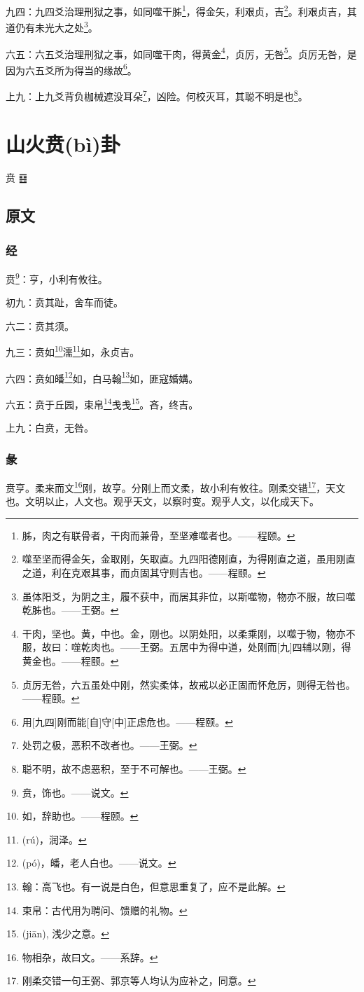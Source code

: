 \documentclass[12pt,oneside]{book}
\begin{document}
九四：九四爻治理刑狱之事，如同噬干胏\footnote{胏，肉之有联骨者，干肉而兼骨，至坚难噬者也。——程颐。}，得金矢，利艰贞，吉\footnote{噬至坚而得金矢，金取刚，矢取直。九四阳德刚直，为得刚直之道，虽用刚直之道，利在克艰其事，而贞固其守则吉也。——程颐。}。利艰贞吉，其道仍有未光大之处\footnote{虽体阳爻，为阴之主，履不获中，而居其非位，以斯噬物，物亦不服，故曰噬乾胏也。——王弼。}。

六五：六五爻治理刑狱之事，如同噬干肉，得黄金\footnote{干肉，坚也。黄，中也。金，刚也。以阴处阳，以柔乘刚，以噬于物，物亦不服，故曰：噬乾肉也。——王弼。五居中为得中道，处刚而[九]四辅以刚，得黄金也。——程颐。}，贞厉，无咎\footnote{贞厉无咎，六五虽处中刚，然实柔体，故戒以必正固而怀危厉，则得无咎也。——程颐。}。贞厉无咎，是因为六五爻所为得当的缘故\footnote{用[九四]刚而能[自]守[中]正虑危也。——程颐。}。

上九：上九爻背负枷械遮没耳朵\footnote{处罚之极，恶积不改者也。——王弼。}，凶险。何校灭耳，其聪不明是也\footnote{聪不明，故不虑恶积，至于不可解也。——王弼。}。



\chapter{山火贲(bì)卦}
贲 {\Large ䷕}

\section{原文}
\subsection{经}
贲\footnote{贲，饰也。——说文。}：亨，小利有攸往。

初九：贲其趾，舍车而徒。

六二：贲其须。

九三：贲如\footnote{如，辞助也。——程颐。}濡\footnote{(rú)，润泽。}如，永贞吉。

六四：贲如皤\footnote{(pó)，皤，老人白也。——说文。}如，白马翰\footnote{翰：高飞也。有一说是白色，但意思重复了，应不是此解。}如，匪寇婚媾。

六五：贲于丘园，束帛\footnote{束帛：古代用为聘问、馈赠的礼物。}戋戋\footnote{(jiān), 浅少之意。}。吝，终吉。

上九：白贲，无咎。

\subsection{彖}
贲亨。柔来而文\footnote{物相杂，故曰文。——系辞。}刚，故亨。分刚上而文柔，故小利有攸往。刚柔交错\footnote{刚柔交错一句王弼、郭京等人均认为应补之，同意。}，天文也。文明以止，人文也。观乎天文，以察时变。观乎人文，以化成天下。
\end{document}
